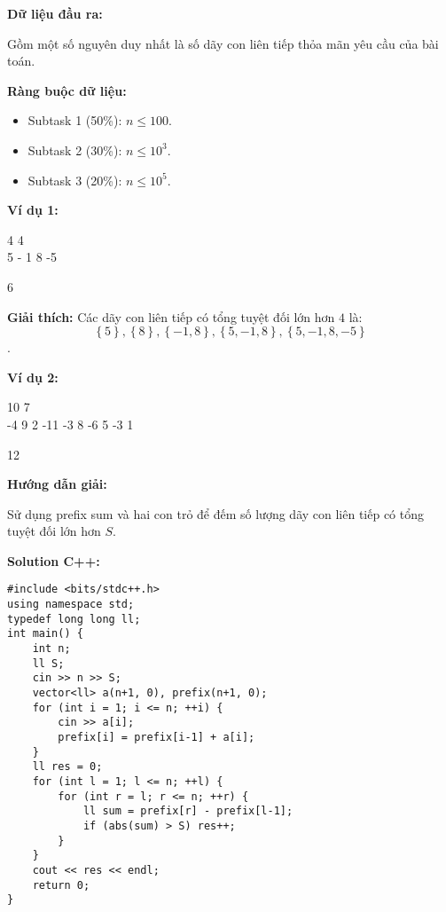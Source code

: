 \documentclass[12pt]{scrartcl}  %
\begin{document}
\textbf{Dữ liệu đầu ra:}

Gồm một số nguyên duy nhất là số dãy con liên tiếp thỏa mãn yêu cầu của bài toán.

\textbf{Ràng buộc dữ liệu:}
\begin{itemize}
    \item Subtask 1 (50\%): $n \leq 100$.
    \item Subtask 2 (30\%): $n \leq 10^3$.
    \item Subtask 3 (20\%): $n \leq 10^5$.
\end{itemize}

\textbf{Ví dụ 1:}
\begin{tcolorbox}[colback=gray!5!white, colframe=blue!50!black, title=Input]
4 4\\
5 - 1 8 -5
\end{tcolorbox}
\begin{tcolorbox}[colback=gray!5!white, colframe=green!50!black, title=Output]
6
\end{tcolorbox}

\textbf{Giải thích:}
Các dãy con liên tiếp có tổng tuyệt đối lớn hơn $4$ là: $$\left\{5 \right\}, \left\{ 8 \right\}, \left\{ -1, 8 \right\}, \left\{ 5, -1, 8 \right\}, \left\{ 5, -1, 8, -5 \right\}$$.

\textbf{Ví dụ 2:}
\begin{tcolorbox}[colback=gray!5!white, colframe=blue!50!black, title=Input]
10 7\\
-4 9 2 -11 -3 8 -6 5 -3 1
\end{tcolorbox}
\begin{tcolorbox}[colback=gray!5!white, colframe=green!50!black, title=Output]
12
\end{tcolorbox}

\textbf{Hướng dẫn giải:}

Sử dụng prefix sum và hai con trỏ để đếm số lượng dãy con liên tiếp có tổng tuyệt đối lớn hơn $S$.

\textbf{Solution C++:}
\begin{lstlisting}
#include <bits/stdc++.h>
using namespace std;
typedef long long ll;
int main() {
    int n;
    ll S;
    cin >> n >> S;
    vector<ll> a(n+1, 0), prefix(n+1, 0);
    for (int i = 1; i <= n; ++i) {
        cin >> a[i];
        prefix[i] = prefix[i-1] + a[i];
    }
    ll res = 0;
    for (int l = 1; l <= n; ++l) {
        for (int r = l; r <= n; ++r) {
            ll sum = prefix[r] - prefix[l-1];
            if (abs(sum) > S) res++;
        }
    }
    cout << res << endl;
    return 0;
}
\end{lstlisting}
\end{document}
